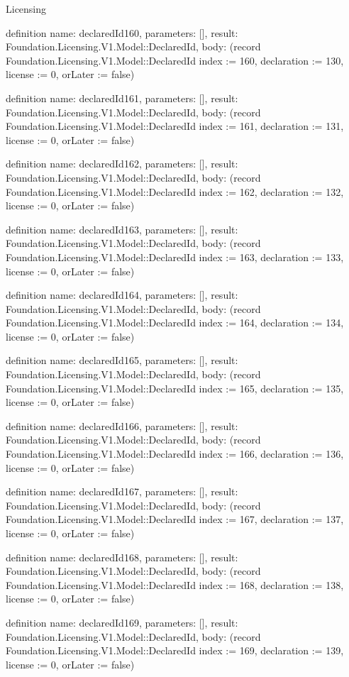 \begin{lexlean}{Licensing}
\begin{semanticmodule}
definition{
  name: declaredId160,
  parameters: [],
  result: Foundation.Licensing.V1.Model::DeclaredId,
  body: (record Foundation.Licensing.V1.Model::DeclaredId {index := 160, declaration := 130, license := 0, orLater := false})
}

definition{
  name: declaredId161,
  parameters: [],
  result: Foundation.Licensing.V1.Model::DeclaredId,
  body: (record Foundation.Licensing.V1.Model::DeclaredId {index := 161, declaration := 131, license := 0, orLater := false})
}

definition{
  name: declaredId162,
  parameters: [],
  result: Foundation.Licensing.V1.Model::DeclaredId,
  body: (record Foundation.Licensing.V1.Model::DeclaredId {index := 162, declaration := 132, license := 0, orLater := false})
}

definition{
  name: declaredId163,
  parameters: [],
  result: Foundation.Licensing.V1.Model::DeclaredId,
  body: (record Foundation.Licensing.V1.Model::DeclaredId {index := 163, declaration := 133, license := 0, orLater := false})
}

definition{
  name: declaredId164,
  parameters: [],
  result: Foundation.Licensing.V1.Model::DeclaredId,
  body: (record Foundation.Licensing.V1.Model::DeclaredId {index := 164, declaration := 134, license := 0, orLater := false})
}

definition{
  name: declaredId165,
  parameters: [],
  result: Foundation.Licensing.V1.Model::DeclaredId,
  body: (record Foundation.Licensing.V1.Model::DeclaredId {index := 165, declaration := 135, license := 0, orLater := false})
}

definition{
  name: declaredId166,
  parameters: [],
  result: Foundation.Licensing.V1.Model::DeclaredId,
  body: (record Foundation.Licensing.V1.Model::DeclaredId {index := 166, declaration := 136, license := 0, orLater := false})
}

definition{
  name: declaredId167,
  parameters: [],
  result: Foundation.Licensing.V1.Model::DeclaredId,
  body: (record Foundation.Licensing.V1.Model::DeclaredId {index := 167, declaration := 137, license := 0, orLater := false})
}

definition{
  name: declaredId168,
  parameters: [],
  result: Foundation.Licensing.V1.Model::DeclaredId,
  body: (record Foundation.Licensing.V1.Model::DeclaredId {index := 168, declaration := 138, license := 0, orLater := false})
}

definition{
  name: declaredId169,
  parameters: [],
  result: Foundation.Licensing.V1.Model::DeclaredId,
  body: (record Foundation.Licensing.V1.Model::DeclaredId {index := 169, declaration := 139, license := 0, orLater := false})
}


\end{semanticmodule}
\end{lexlean}
